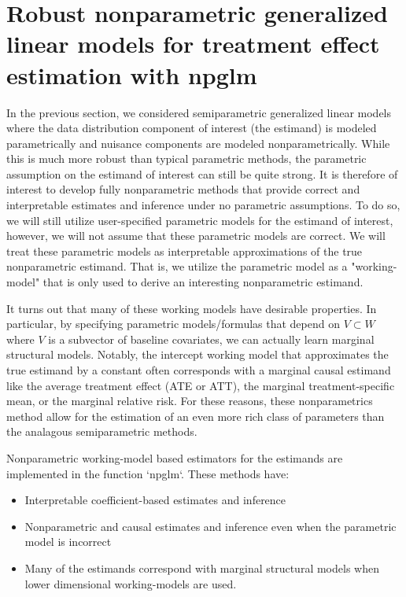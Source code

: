 \documentclass{article}
\begin{document}
\section{Robust nonparametric generalized linear models for treatment effect estimation  with npglm}
In the previous section, we considered semiparametric generalized linear models where the data distribution component of interest (the estimand) is modeled parametrically and nuisance components are modeled nonparametrically. While this is much more robust than typical parametric methods, the parametric assumption on the estimand of interest can still be quite strong. It is therefore of interest to develop fully nonparametric methods that provide correct and interpretable estimates and inference under no parametric assumptions. To do so, we will still utilize user-specified parametric models for the estimand of interest, however, we will not assume that these parametric models are correct. We will treat these parametric models as interpretable approximations of the true nonparametric estimand. That is, we utilize the parametric model as a "working-model" that is only used to derive an interesting nonparametric estimand.

It turns out that many of these working models have desirable properties. In particular, by specifying parametric models/formulas that depend on $V \subset W$ where $V$ is a subvector of baseline covariates, we can actually learn marginal structural models. Notably, the intercept working model that approximates the true estimand by a constant often corresponds with a marginal causal estimand like the average treatment effect (ATE or ATT), the marginal treatment-specific mean, or the marginal relative risk. For these reasons, these nonparametrics method allow for the estimation of an even more rich class of parameters than the analagous semiparametric methods.

Nonparametric working-model based estimators for the estimands are implemented in the function `npglm`. These methods have:

\begin{itemize}
\item Interpretable coefficient-based estimates and inference
\item Nonparametric and causal estimates and inference even when the parametric model is incorrect
\item Many of the estimands correspond with marginal structural models when lower dimensional working-models are used.
\end{itemize}
\end{document}
